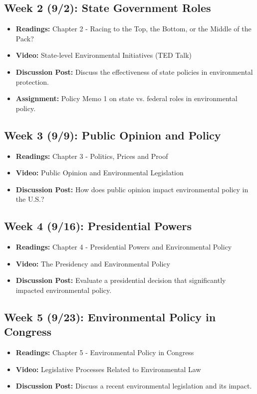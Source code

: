\documentclass[12pt, letterpaper]{article}
\begin{document}
\subsection*{Week 2 (9/2): State Government Roles}
\begin{itemize}
    \item \textbf{Readings:} Chapter 2 - Racing to the Top, the Bottom, or the Middle of the Pack?
    \item \textbf{Video:} State-level Environmental Initiatives (TED Talk)
    \item \textbf{Discussion Post:} Discuss the effectiveness of state policies in environmental protection.
    \item \textbf{Assignment:} Policy Memo 1 on state vs. federal roles in environmental policy.
\end{itemize}

\subsection*{Week 3 (9/9): Public Opinion and Policy}
\begin{itemize}
    \item \textbf{Readings:} Chapter 3 - Politics, Prices and Proof
    \item \textbf{Video:} Public Opinion and Environmental Legislation
    \item \textbf{Discussion Post:} How does public opinion impact environmental policy in the U.S.?
\end{itemize}

\subsection*{Week 4 (9/16): Presidential Powers}
\begin{itemize}
    \item \textbf{Readings:} Chapter 4 - Presidential Powers and Environmental Policy
    \item \textbf{Video:} The Presidency and Environmental Policy
    \item \textbf{Discussion Post:} Evaluate a presidential decision that significantly impacted environmental policy.
\end{itemize}

\subsection*{Week 5 (9/23): Environmental Policy in Congress}
\begin{itemize}
    \item \textbf{Readings:} Chapter 5 - Environmental Policy in Congress
    \item \textbf{Video:} Legislative Processes Related to Environmental Law
    \item \textbf{Discussion Post:} Discuss a recent environmental legislation and its impact.
\end{itemize}
\end{document}
